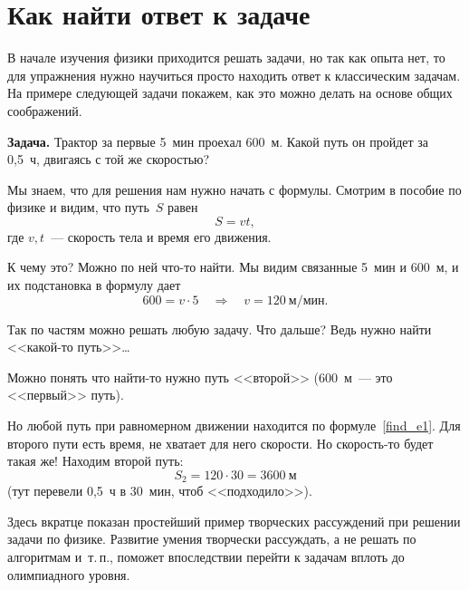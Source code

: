 \documentclass[main.tex]{subfiles}
\begin{document}


\setcounter{section}{22
}
\addtocounter{section}{-1} 


\section{Как найти ответ к задаче}

В начале изучения физики приходится решать задачи, но так как опыта нет, то для упражнения нужно научиться просто находить ответ к классическим задачам. На примере следующей задачи покажем, как это можно делать на основе общих соображений.

\medskip

\noindent\textbf{Задача.} Трактор за первые 5~мин проехал 600~м. Какой путь он пройдет за 0,5~ч, двигаясь с той же скоростью? 

\medskip

Мы знаем, что для решения нам нужно начать с формулы. Смотрим в пособие по физике и видим, что путь~$S$ равен
\begin{equation}
\label{find_e1}
S=vt,
\end{equation}
где $v,t$~--- скорость тела и время его движения.

К чему это? Можно по ней что-то найти. Мы видим связанные 5~мин и 600~м, и их подстановка в формулу дает
$$
600=v\cdot5\quad \Rightarrow\quad v=120~\text{м/мин}.
$$

Так по частям можно решать любую задачу. Что дальше? Ведь нужно найти <<какой-то путь>>\ldots\

Можно понять что найти-то нужно путь <<второй>> (600~м~--- это <<первый>> путь).

Но любой путь при равномерном движении находится по формуле~\eqref{find_e1}. Для второго пути есть время, не хватает для него скорости. Но скорость-то будет такая же! Находим второй путь:
$$
S_2=120\cdot30=3600~\text{м}
$$
(тут перевели 0,5~ч в 30~мин, чтоб <<подходило>>).

\smallskip

Здесь вкратце показан простейший пример творческих рассуждений при решении задачи по физике. Развитие умения творчески рассуждать, а не решать по алгоритмам и~т.\,п., поможет впоследствии перейти к задачам вплоть до олимпиадного уровня. 
\end{document}

